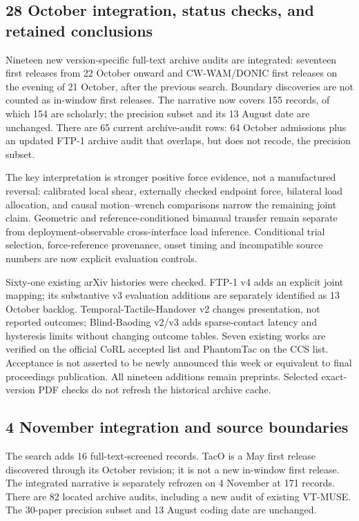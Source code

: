 \subsection{28 October integration, status checks, and retained conclusions}

Nineteen new version-specific full-text archive audits are integrated: seventeen
first releases from 22 October onward and CW-WAM/DONIC first releases on the
evening of 21 October, after the previous search. Boundary discoveries are not
counted as in-window first releases. The narrative now covers 155 records, of
which 154 are scholarly; the precision subset and its 13 August date are unchanged.
There are 65 current archive-audit rows: 64 October admissions plus an updated
FTP-1 archive audit that overlaps, but does not recode, the precision subset.

The key interpretation is stronger positive force evidence, not a manufactured
reversal: calibrated local shear, externally checked endpoint force, bilateral
load allocation, and causal motion--wrench comparisons narrow the remaining
joint claim. Geometric and reference-conditioned bimanual transfer remain
separate from deployment-observable cross-interface load inference. Conditional
trial selection, force-reference provenance, onset timing and incompatible
source numbers are now explicit evaluation controls.

Sixty-one existing arXiv histories were checked. FTP-1 v4 adds an explicit joint
mapping; its substantive v3 evaluation additions are separately identified as
13 October backlog. Temporal-Tactile-Handover v2 changes presentation, not
reported outcomes; Blind-Baoding v2/v3 adds sparse-contact latency and hysteresis
limits without changing outcome tables. Seven existing works are verified on the
official CoRL accepted list and PhantomTac on the CCS list. Acceptance is not
asserted to be newly announced this week or equivalent to final proceedings
publication. All nineteen additions remain preprints. Selected exact-version
PDF checks do not refresh the historical archive cache.


\subsection{4 November integration and source boundaries}

The search adds 16 full-text-screened records. TacO is a May first release
discovered through its October revision; it is not a new in-window first release.
The integrated narrative is separately refrozen on 4 November at 171 records.
There are 82 located archive audits, including a new audit of existing VT-MUSE.
The 30-paper precision subset and 13 August coding date are unchanged.

